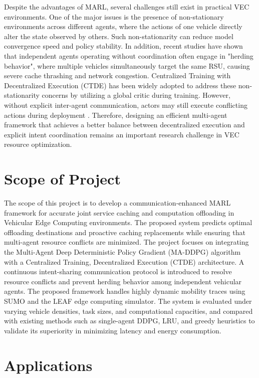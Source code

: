 \documentclass[12pt,a4paper]{report}
\begin{document}
Despite the advantages of MARL, several challenges still exist in practical VEC environments. One of the major issues is the presence of non-stationary environments across different agents, where the actions of one vehicle directly alter the state observed by others. Such non-stationarity can reduce model convergence speed and policy stability. In addition, recent studies have shown that independent agents operating without coordination often engage in "herding behavior", where multiple vehicles simultaneously target the same RSU, causing severe cache thrashing and network congestion. Centralized Training with Decentralized Execution (CTDE) has been widely adopted to address these non-stationarity concerns by utilizing a global critic during training. However, without explicit inter-agent communication, actors may still execute conflicting actions during deployment \cite{marl_comm}. Therefore, designing an efficient multi-agent framework that achieves a better balance between decentralized execution and explicit intent coordination remains an important research challenge in VEC resource optimization.

\section{Scope of Project}
The scope of this project is to develop a communication-enhanced MARL framework for accurate joint service caching and computation offloading in Vehicular Edge Computing environments. The proposed system predicts optimal offloading destinations and proactive caching replacements while ensuring that multi-agent resource conflicts are minimized. The project focuses on integrating the Multi-Agent Deep Deterministic Policy Gradient (MA-DDPG) algorithm with a Centralized Training, Decentralized Execution (CTDE) architecture. A continuous intent-sharing communication protocol is introduced to resolve resource conflicts and prevent herding behavior among independent vehicular agents. The proposed framework handles highly dynamic mobility traces using SUMO and the LEAF edge computing simulator. The system is evaluated under varying vehicle densities, task sizes, and computational capacities, and compared with existing methods such as single-agent DDPG, LRU, and greedy heuristics to validate its superiority in minimizing latency and energy consumption.

\section{Applications}
\end{document}
